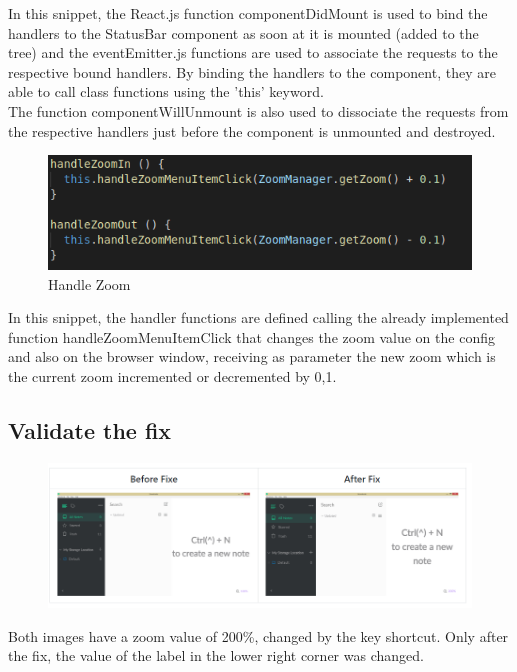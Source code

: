 \documentclass[main.tex]{subfiles}
\begin{document}
In this snippet, the React.js function componentDidMount is used to bind the handlers to the StatusBar component as soon at it is mounted (added to the tree) and the eventEmitter.js functions are used to associate the requests to the respective bound handlers. By binding the handlers to the component, they are able to call class functions using the 'this' keyword.\\

The function componentWillUnmount is also used to dissociate the requests from the respective handlers just before the component is unmounted and destroyed.

\clearpage

\begin{figure}[h]
\includegraphics[scale=0.9]{images/handlezoom.png}
\centering
\caption{Handle Zoom}
\end{figure}

In this snippet, the handler functions are defined calling the already implemented function handleZoomMenuItemClick that changes the zoom value on the config and also on the browser window, receiving as parameter the new zoom which is the current zoom incremented or decremented by 0,1.

\subsection{Validate the fix}

\begin{figure}[h]
\includegraphics[scale=0.95]{images/table.png}
\centering
\end{figure}

Both images have a zoom value of 200\%, changed by the key shortcut. Only after the fix, the value of the label in the lower right corner was changed.\\
\end{document}
